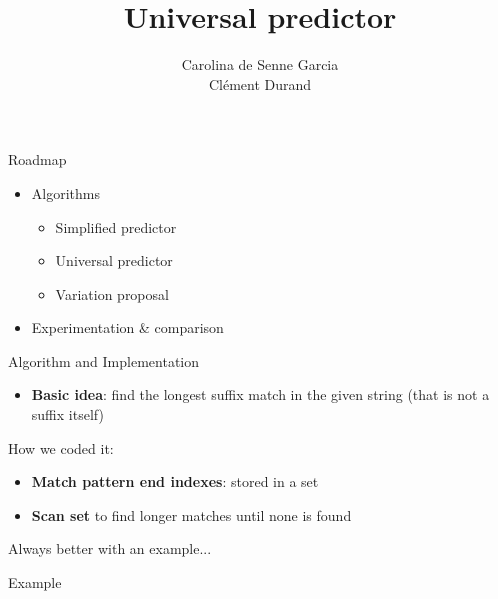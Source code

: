 \documentclass[aspectratio=169]{beamer}
\title[Pattern-based prediction algorithms, applications and variations]
      {Universal predictor}
\author{%
  Carolina de Senne Garcia\\%
  Clément Durand%
}
\begin{document}
\maketitle

\begin{frame}{Roadmap}\Large
  \begin{itemize}
    \item Algorithms
      \begin{itemize}
        \item Simplified predictor
        \item Universal predictor
        \item Variation proposal
      \end{itemize}
    \item Experimentation \& comparison
  \end{itemize}
\end{frame}


\begin{frame}{Algorithm and Implementation}
  \begin{itemize}
    \item \textbf{Basic idea}: find the longest suffix match in the given string (that is not a suffix itself)
  \end{itemize}

  \vspace{\fill}

  How we coded it:
  \begin{itemize}
    \item \textbf{Match pattern end indexes}: stored in a set
    \item \textbf{Scan set} to find longer matches until none is found
  \end{itemize}
  \vspace{\fill}

    Always better with an example...

\end{frame}

\begin{frame}{Example}\centering
  
\end{frame}

\end{document}
